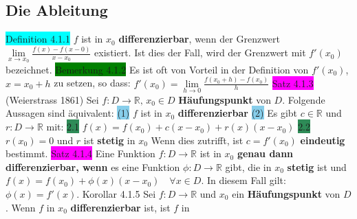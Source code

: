 \documentclass[landscape, 10pt]{article}
\newcommand{\R}{\mathbb{R}}
\begin{document}
\begin{multicols}{3}
\subsection{Die Ableitung}
\colorbox{cyan}{Definition 4.1.1} $f$ ist in $x_0$ \textbf{differenzierbar}, 
                wenn der Grenzwert \textcolor{NavyBlue}{
                $\lim\limits_{x\to x_0}\frac{f(x)-f(x-0)}{x-x_0}$}
                existiert. Ist dies der Fall, wird 
         der Grenzwert mit \textcolor{NavyBlue}{$f'(x_0)$} bezeichnet.
\colorbox{green}{Bemerkung 4.1.2} Es ist oft von Vorteil in der Definition von 
                \textcolor{NavyBlue}{$f'(x_0)$},\,
                \textcolor{NavyBlue}{$x=x_0+h$} zu setzen, so dass: 
         \textcolor{NavyBlue}{
                $f'(x_0)=\lim\limits_{h\to 0}\frac{f(x_0+h)-f(x_0)}{h}$}
\colorbox{magenta}{Satz 4.1.3} (Weierstrass 1861) Sei 
                \textcolor{NavyBlue}{$f:D\longrightarrow\R,\,x_0\in D$}
                \textbf{Häufungspunkt} von \textcolor{NavyBlue}{$D$}. 
                Folgende Aussagen sind 
         äquivalent: 
                \colorbox{SkyBlue}{(1)} \textcolor{NavyBlue}{$f$} ist in 
                \textcolor{NavyBlue}{$x_0$} \textbf{differenzierbar} \qquad
                \colorbox{SkyBlue}{(2)} Es gibt \textcolor{NavyBlue}{$c\in\R$} und 
                \textcolor{NavyBlue}{$r:D\longrightarrow\R$} mit: 
         \colorbox{SeaGreen}{2.1} 
                \textcolor{NavyBlue}{$f(x)=f(x_0)+c(x-x_0)+r(x)(x-x_0)$} \qquad
                \colorbox{SeaGreen}{2.2} \textcolor{NavyBlue}{$r(x_0)=0$} und 
                \textcolor{NavyBlue}{$r$} ist \textbf{stetig} in \textcolor{NavyBlue}{$x_0$}
         Wenn dies zutrifft, ist \textcolor{NavyBlue}{$c=f'(x_0)$} 
                \textbf{eindeutig} bestimmt. 
\colorbox{magenta}{Satz 4.1.4} Eine Funktion 
                \textcolor{NavyBlue}{$f:D\longrightarrow\R$} ist in 
                $x_0$ \textbf{genau dann differenzierbar, wenn} es eine 
                Funktion \textcolor{NavyBlue}{$\phi:D\longrightarrow\R$}
         gibt, die in \textcolor{NavyBlue}{$x_0$} \textbf{stetig} ist 
                und \textcolor{NavyBlue}{$f(x)=f(x_0)+\phi(x)(x-x_0)\quad\forall x\in D$}. 
                In diesem Fall gilt: \textcolor{NavyBlue}{$\phi(x)=f'(x)$}.
\colorbox{BurntOrange}{Korollar 4.1.5} Sei \textcolor{NavyBlue}{$f:D\longrightarrow\R$}
                und \textcolor{NavyBlue}{$x_0$} ein \textbf{Häufungspunkt} von 
                \textcolor{NavyBlue}{$D$}. 
                Wenn \textcolor{NavyBlue}{$f$} in \textcolor{NavyBlue}{$x_0$} 
                \textbf{differenzierbar} ist, ist \textcolor{NavyBlue}{$f$} in 

\end{multicols}
\end{document}
